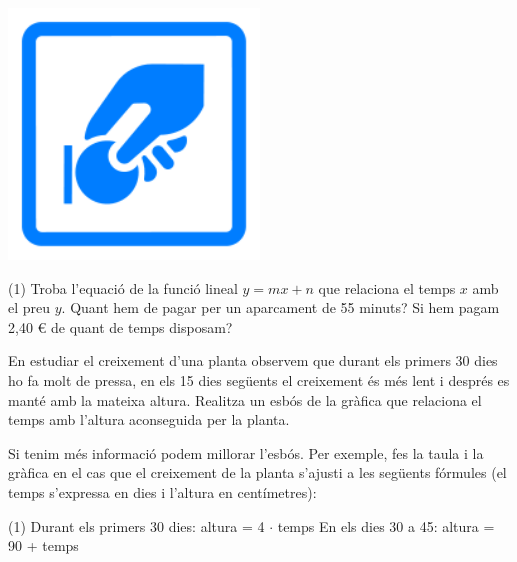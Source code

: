 \begin{mylist}
\begin{minipage}[t]{0.7\textwidth}
\end{minipage}
\begin{minipage}{0.3\textwidth}
	\centering
	\vspace{1.5cm}
	\includegraphics[width=0.5\textwidth]{img-08/ora}
\end{minipage}
	\begin{tasks}(1)
	\task Troba l'equació de la funció lineal $y=mx+n$ que relaciona el temps $x$ amb el preu $y$.
	\task Quant hem de pagar per un aparcament de 55 minuts?	
	\task Si hem pagam 2,40 \euro{} de quant de temps disposam?
\end{tasks}
 
\answers[cols=1]{[$y=0.03 x$, $1.65$ \euro{}, 80 minuts]}
 

\exer  En estudiar el creixement d'una planta observem que durant els primers 30 dies ho fa molt de pressa, en els 15 dies següents el creixement és més lent i després es manté amb la mateixa altura. Realitza un esbós de la gràfica que relaciona el temps amb l'altura aconseguida per la planta.


 Si tenim més informació podem millorar l'esbós. Per exemple, fes la taula i la gràfica en el cas que el creixement de la planta s'ajusti a les següents fórmules (el temps s'expressa en dies i l'altura en centímetres):
\begin{tasks}(1)
\task  Durant els primers 30 dies:  altura = 4 $\cdot$ temps
\task En els dies 30 a 45: altura = 90 + temps
 \end{tasks}



\end{mylist}
